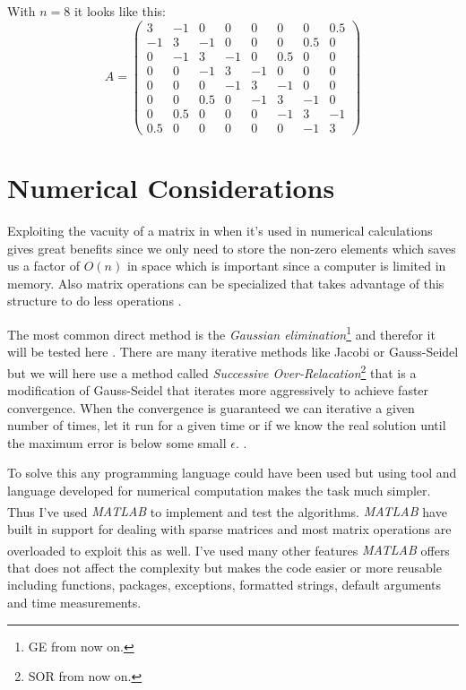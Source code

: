 \documentclass[10pt, a4paper]{article}
\newcommand{\matlab}{\small{\emph{MATLAB\textsuperscript{\textregistered}}}}
\begin{document}
With $n=8$ it looks like this:
\begin{displaymath}
A = \left( \begin{array}{cccccccc}
  3   & -1  & 0   & 0  & 0  & 0   & 0   & 0.5 \\
  -1  & 3   & -1  & 0  & 0  & 0   & 0.5 & 0   \\
  0   & -1  & 3   & -1 & 0  & 0.5 & 0   & 0   \\
  0   & 0   & -1  & 3  & -1 & 0   & 0   & 0   \\
  0   & 0   & 0   & -1 & 3  & -1  & 0   & 0   \\
  0   & 0   & 0.5 & 0  & -1 & 3   & -1  & 0   \\
  0   & 0.5 & 0   & 0  & 0  & -1  & 3   & -1  \\
  0.5 & 0   & 0   & 0  & 0  & 0   & -1  & 3
\end{array} \right)
\end{displaymath}

\section{Numerical Considerations}
Exploiting the vacuity of a matrix in when it's used in numerical calculations gives great benefits since we only need to store the non-zero elements which saves us a factor of $O(n)$ in space which is important since a computer is limited in memory. Also matrix operations can be specialized that takes advantage of this structure to do less operations \cite{sparsemat}.

The most common direct method is the \emph{Gaussian elimination}\footnote{GE from now on.} and therefor it will be tested here \cite{gauss}. There are many iterative methods like Jacobi or Gauss-Seidel but we will here use a method called \emph{Successive Over-Relacation}\footnote{SOR from now on.} that is a modification of Gauss-Seidel that iterates more aggressively to achieve faster convergence. When the convergence is guaranteed we can iterative a given number of times, let it run for a given time or if we know the real solution until the maximum error is below some small $\epsilon.$ \cite{sor}.

To solve this any programming language could have been used but using tool and language developed for numerical computation makes the task much simpler. Thus I've used \matlab{} to implement and test the algorithms. \matlab{} have built in support for dealing with sparse matrices and most matrix operations are overloaded to exploit this as well. I've used many other features \matlab{} offers that does not affect the complexity but makes the code easier or more reusable including functions, packages, exceptions, formatted strings, default arguments and time measurements.
\end{document}
